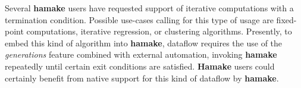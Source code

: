\documentclass[10pt,conference,letterpaper]{IEEEtran}
\begin{document}
Several \textbf{hamake} users have requested support of iterative computations
with a termination condition. Possible use-cases calling for this type
of usage are fixed-point computations, iterative regression, or
clustering algorithms. Presently, to embed this kind of algorithm
into \textbf{hamake}, dataflow requires the use of the \textit{generations} feature
combined with external automation, invoking \textbf{hamake} repeatedly until
certain exit conditions are satisfied. \textbf{Hamake} users could
certainly benefit from native support for this kind of dataflow by
\textbf{hamake}.

\nocite{*}


\end{document}
